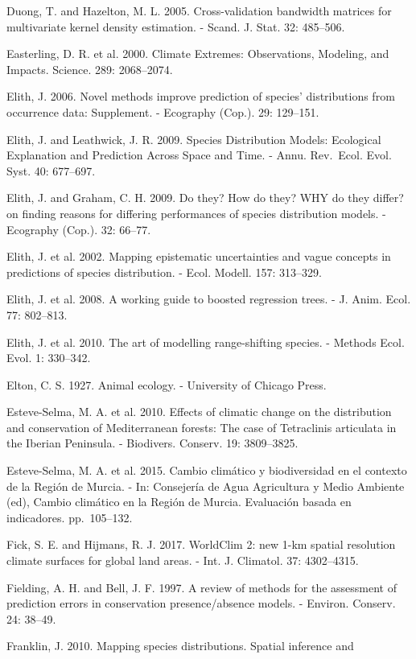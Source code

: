 \documentclass[11pt,twoside]{reedthesis}
\begin{document}
Duong, T. and Hazelton, M. L. 2005. Cross-validation bandwidth matrices
for multivariate kernel density estimation. - Scand. J. Stat. 32:
485--506.\par
Easterling, D. R. et al. 2000. Climate Extremes: Observations, Modeling,
and Impacts. Science. 289: 2068--2074.\par
Elith, J. 2006. Novel methods improve prediction of species'
distributions from occurrence data: Supplement. - Ecography (Cop.). 29:
129--151.\par
Elith, J. and Leathwick, J. R. 2009. Species Distribution Models:
Ecological Explanation and Prediction Across Space and Time. - Annu.
Rev.~Ecol. Evol. Syst. 40: 677--697.\par
Elith, J. and Graham, C. H. 2009. Do they? How do they? WHY do they
differ? on finding reasons for differing performances of species
distribution models. - Ecography (Cop.). 32: 66--77.\par
Elith, J. et al. 2002. Mapping epistematic uncertainties and vague
concepts in predictions of species distribution. - Ecol. Modell. 157:
313--329.\par
Elith, J. et al. 2008. A working guide to boosted regression trees. - J.
Anim. Ecol. 77: 802--813.\par
Elith, J. et al. 2010. The art of modelling range-shifting species. -
Methods Ecol. Evol. 1: 330--342.\par
Elton, C. S. 1927. Animal ecology. - University of Chicago Press.\par
Esteve-Selma, M. A. et al. 2010. Effects of climatic change on the
distribution and conservation of Mediterranean forests: The case of
Tetraclinis articulata in the Iberian Peninsula. - Biodivers. Conserv.
19: 3809--3825.\par
Esteve-Selma, M. A. et al. 2015. Cambio climático y biodiversidad en el
contexto de la Región de Murcia. - In: Consejería de Agua Agricultura y
Medio Ambiente (ed), Cambio climático en la Región de Murcia. Evaluación
basada en indicadores. pp.~105--132.\par
Fick, S. E. and Hijmans, R. J. 2017. WorldClim 2: new 1-km spatial
resolution climate surfaces for global land areas. - Int. J. Climatol.
37: 4302--4315.\par
Fielding, A. H. and Bell, J. F. 1997. A review of methods for the
assessment of prediction errors in conservation presence/absence models.
- Environ. Conserv. 24: 38--49.\par
Franklin, J. 2010. Mapping species distributions. Spatial inference and
\end{document}
